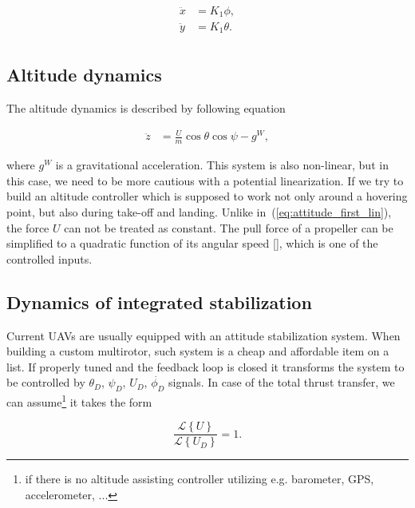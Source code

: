 \begin{equation}
\begin{split}
\ddot{x} &= K_1 \phi,\\
\ddot{y} &= K_1 \theta.\\
\end{split}
\end{equation}

\subsection{Altitude dynamics}

The altitude dynamics is described by following equation

\begin{equation}
\begin{split}
\ddot{z} &= \frac{U}{m}\cos\theta\cos\psi - g^W,
\end{split}
\end{equation}

where $g^W$ is a gravitational acceleration. This system is also non-linear, but in this case, we need to be more cautious with a potential linearization. If we try to build an altitude controller which is supposed to work not only around a hovering point, but also during take-off and landing. Unlike in~(\ref{eq:attitude_first_lin}), the force $U$ can not be treated as constant. The pull force of a propeller can be simplified to a quadratic function of its angular speed [], which is one of the controlled inputs.

\subsection{Dynamics of integrated stabilization}

Current UAVs are usually equipped with an attitude stabilization system. When building a custom multirotor, such system is a cheap and affordable item on a list. If properly tuned and the feedback loop is closed it transforms the system to be controlled by $\theta_D$, $\psi_D$, $U_D$, $\dot{\phi_D}$ signals. In case of the total thrust transfer, we can assume\footnote{if there is no altitude assisting controller utilizing e.g. barometer, GPS, accelerometer, ...} it takes the form

\begin{equation}
\frac{\mathcal{L}\left\lbrace U \right\rbrace}{\mathcal{L}\left\lbrace U_D \right\rbrace} = 1.
\end{equation}

